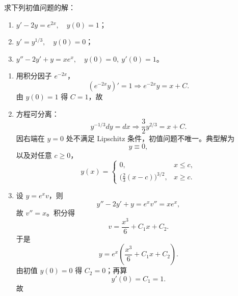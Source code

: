 ﻿


\begin{question}
求下列初值问题的解：
\begin{enumerate}[label=（\arabic*）,leftmargin=2.8em,itemsep=0.2em]
\item $y'-2y=e^{2x},\quad y(0)=1$；
\item $y'=y^{1/3},\quad y(0)=0$；
\item $y''-2y'+y=xe^x,\quad y(0)=0,\ y'(0)=1$。
\end{enumerate}
\begin{solution}

\begin{enumerate}[label=（\arabic*）,leftmargin=2.8em,itemsep=0.2em]
\item 用积分因子 $e^{-2x}$，
\[
(e^{-2x}y)'=1\Longrightarrow e^{-2x}y=x+C.
\]
由 $y(0)=1$ 得 $C=1$，故
\item 方程可分离：
\[
 y^{-1/3}dy=dx\Longrightarrow \frac32 y^{2/3}=x+C.
\]
因右端在 $y=0$ 处不满足 Lipschitz 条件，初值问题不唯一。典型解为
\[
 y\equiv0,
\]
以及对任意 $c\ge0$，
\[
 y(x)=\begin{cases}
 0,&x\le c,\\
 \bigl(\frac23(x-c)\bigr)^{3/2},&x\ge c.
 \end{cases}
\]
\item 设 $y=e^xv$，则
\[
 y''-2y'+y=e^xv''=xe^x,
\]
故 $v''=x$。积分得
\[
 v=\frac{x^3}{6}+C_1x+C_2.
\]
于是
\[
 y=e^x\left(\frac{x^3}{6}+C_1x+C_2\right).
\]
由初值 $y(0)=0$ 得 $C_2=0$；再算
\[
 y'(0)=C_1=1.
\]
故
\end{enumerate}
\end{solution}
\end{question}

